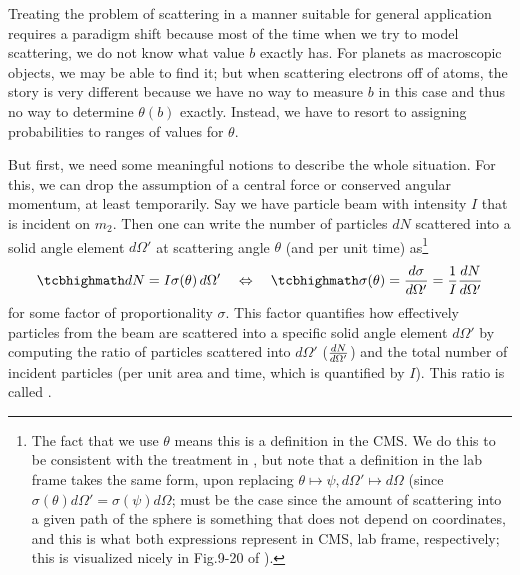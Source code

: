 \documentclass[../class_mech_main.tex]{subfiles}
\begin{document}
Treating the problem of scattering in a manner suitable for general application requires a paradigm shift because most of the time when we try to model scattering, we do not know what value $b$ exactly has. For planets as macroscopic objects, we may be able to find it; but when scattering electrons off of atoms, the story is very different because we have no way to measure $b$ in this case and thus no way to determine $\theta(b)$ exactly. Instead, we have to resort to assigning probabilities to ranges of values for $\theta$.


But first, we need some meaningful notions to describe the whole situation. For this, we can drop the assumption of a central force or conserved angular momentum, at least temporarily. Say we have particle beam with intensity $I$ that is incident on $m_2$. Then one can write the number of particles $dN$ scattered into a solid angle element $d\Omega'$ at scattering angle $\theta$ (and per unit time) as\footnote{The fact that we use $\theta$ means this is a definition in the CMS. We do this to be consistent with the treatment in \cite{Thornton_2003}, but note that a definition in the lab frame takes the same form, upon replacing $\theta \mapsto \psi, d\Omega' \mapsto d\Omega$ (since $\sigma(\theta) d\Omega' = \sigma(\psi) d\Omega$; must be the case since the amount of scattering into a given path of the sphere is something that does not depend on coordinates, and this is what both expressions represent in CMS, lab frame, respectively; this is visualized nicely in Fig.9-20 of \cite{Thornton_2003}).}
\begin{equation}\label{eq:cross_section_cms}
	\eqbox{
		dN = I \sigma(\theta) \, d\Omega'
	}
	\quad \Leftrightarrow \quad
	\eqbox{
		\sigma(\theta) = \dv{\sigma}{\Omega'} = \frac{1}{I} \dv{N}{\Omega'}
	}
\end{equation}
for some factor of proportionality $\sigma$. This factor quantifies how effectively particles from the beam are scattered into a specific solid angle element $d\Omega'$ by computing the ratio of particles scattered into $d\Omega'$ ($\dv{N}{\Omega'}$) and the total number of incident particles (per unit area and time, which is quantified by $I$). This ratio is called .

\end{document}

